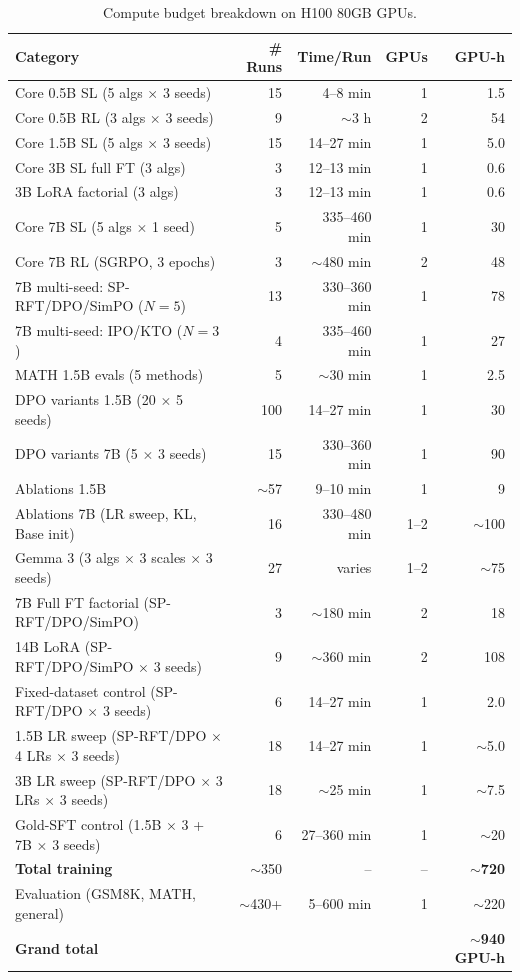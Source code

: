 \documentclass{article}
\newcommand{\sprft}{SP-RFT}
\begin{document}
\begin{table}[ht]
\centering
\caption{Compute budget breakdown on H100 80GB GPUs.}
\label{tab:compute}
\small
\begin{tabular}{@{}lrrrr@{}}
\toprule
\textbf{Category} & \textbf{\# Runs} & \textbf{Time/Run} & \textbf{GPUs} & \textbf{GPU-h} \\
\midrule
Core 0.5B SL (5 algs $\times$ 3 seeds) & 15 & 4--8 min & 1 & 1.5 \\[2pt]
Core 0.5B RL (3 algs $\times$ 3 seeds) & 9 & $\sim$3 h & 2 & 54 \\[2pt]
Core 1.5B SL (5 algs $\times$ 3 seeds) & 15 & 14--27 min & 1 & 5.0 \\[2pt]
Core 3B SL full FT (3 algs) & 3 & 12--13 min & 1 & 0.6 \\[2pt]
3B LoRA factorial (3 algs) & 3 & 12--13 min & 1 & 0.6 \\[2pt]
Core 7B SL (5 algs $\times$ 1 seed) & 5 & 335--460 min & 1 & 30 \\[2pt]
Core 7B RL (SGRPO, 3 epochs) & 3 & $\sim$480 min & 2 & 48 \\[2pt]
7B multi-seed: \sprft{}/DPO/SimPO ($N{=}5$) & 13 & 330--360 min & 1 & 78 \\[2pt]
7B multi-seed: IPO/KTO ($N{=}3$) & 4 & 335--460 min & 1 & 27 \\[2pt]
MATH 1.5B evals (5 methods) & 5 & $\sim$30 min & 1 & 2.5 \\[2pt]
DPO variants 1.5B (20 $\times$ 5 seeds) & 100 & 14--27 min & 1 & 30 \\[2pt]
DPO variants 7B (5 $\times$ 3 seeds) & 15 & 330--360 min & 1 & 90 \\[2pt]
Ablations 1.5B & $\sim$57 & 9--10 min & 1 & 9 \\[2pt]
Ablations 7B (LR sweep, KL, Base init) & 16 & 330--480 min & 1--2 & $\sim$100 \\[2pt]
Gemma 3 (3 algs $\times$ 3 scales $\times$ 3 seeds) & 27 & varies & 1--2 & $\sim$75 \\[2pt]
7B Full FT factorial (\sprft{}/DPO/SimPO) & 3 & $\sim$180 min & 2 & 18 \\[2pt]
14B LoRA (\sprft{}/DPO/SimPO $\times$ 3 seeds) & 9 & $\sim$360 min & 2 & 108 \\[2pt]
Fixed-dataset control (\sprft{}/DPO $\times$ 3 seeds) & 6 & 14--27 min & 1 & 2.0 \\[2pt]
1.5B LR sweep (\sprft{}/DPO $\times$ 4 LRs $\times$ 3 seeds) & 18 & 14--27 min & 1 & $\sim$5.0 \\[2pt]
3B LR sweep (\sprft{}/DPO $\times$ 3 LRs $\times$ 3 seeds) & 18 & $\sim$25 min & 1 & $\sim$7.5 \\[2pt]
Gold-SFT control (1.5B $\times$ 3 + 7B $\times$ 3 seeds) & 6 & 27--360 min & 1 & $\sim$20 \\[2pt]
\midrule
\textbf{Total training} & $\sim$350 & -- & -- & $\sim$\textbf{720} \\[2pt]
Evaluation (GSM8K, MATH, general) & $\sim$430+ & 5--600 min & 1 & $\sim$220 \\[2pt]
\midrule
\textbf{Grand total} & & & & $\sim$\textbf{940 GPU-h} \\
\bottomrule
\end{tabular}
\end{table}
\end{document}
